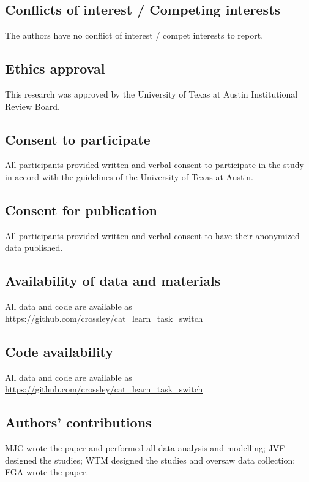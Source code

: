 \documentclass[doc, floatsintext]{apa7}
\begin{document}
\subsection{Conflicts of interest / Competing interests}
The authors have no conflict of interest / compet interests
to report.

\subsection{Ethics approval}
This research was approved by the University of Texas at
Austin Institutional Review Board.

\subsection{Consent to participate}
All participants provided written and verbal consent to
participate in the study in accord with the guidelines of
the University of Texas at Austin.

\subsection{Consent for publication}
All participants provided written and verbal consent to have
their anonymized data published. 

\subsection{Availability of data and materials}
All data and code are available as
\url{https://github.com/crossley/cat_learn_task_switch}

\subsection{Code availability}
All data and code are available as
\url{https://github.com/crossley/cat_learn_task_switch}

\subsection{Authors' contributions}
MJC wrote the paper and performed all data analysis and
modelling;  JVF designed the studies;  WTM designed the
studies and oversaw data collection; FGA wrote the paper.

\printbibliography
\end{document}
